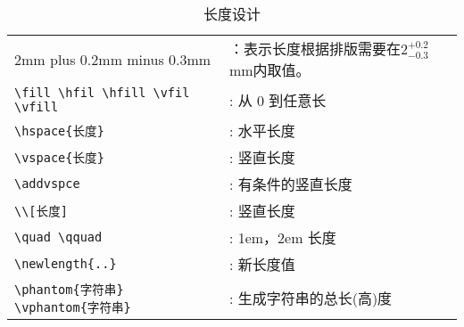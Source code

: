 \begin{table}[htbp]
  \centering
  \caption{长度设计}\label{length_design}
\begin{tabularx}{13cm}{p{5cm}X}
\toprule
2mm plus 0.2mm minus 0.3mm  &：表示长度根据排版需要在$2^{+0.2}_{-0.3}$mm内取值。\\
\verb|\fill \hfil \hfill \vfil \vfill| &: 从 0 到任意长\\
\verb|\hspace{长度}| &: 水平长度\\
\verb|\vspace{长度}| &: 竖直长度\\
\verb|\addvspce| &:  有条件的竖直长度\\
\verb|\\[长度]| &: 竖直长度\\
\verb|\quad \qquad| &: 1em，2em 长度\\
\verb|\newlength{..}| &: 新长度值\\
\verb|\phantom{字符串} \vphantom{字符串}| &: 生成字符串的总长(高)度\\
\bottomrule
\end{tabularx}
\end{table}

